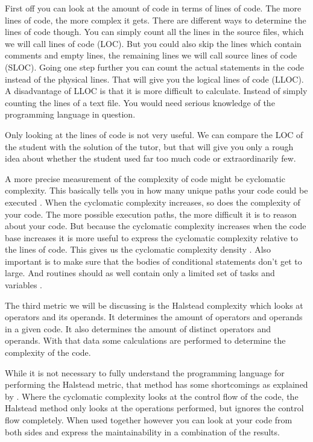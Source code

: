 First off you can look at the amount of \gls{code}
in terms of lines of \gls{code}.
The more lines of \gls{code}, the more complex it gets.
There are different ways to determine the lines of \gls{code} though.
You can simply count all the lines in the source files,
which we will call lines of code (LOC).
But you could also skip the lines which contain comments and empty lines,
the remaining lines we will call source lines of code (SLOC).
Going one step further you can count the actual statements in the \gls{code}
instead of the physical lines.
That will give you the logical lines of code (LLOC).
A disadvantage of LLOC is that it is more difficult to calculate.
Instead of simply counting the lines of a text file.
You would need serious knowledge of the programming language in question.

Only looking at the lines of \gls{code} is not very useful.
We can compare the LOC of the \gls{student}
with the \gls{solution} of the \gls{tutor},
but that will give you only a rough idea about
whether the \gls{student} used far too much \gls{code} or extraordinarily few.

A more precise measurement of the complexity of code
might be cyclomatic complexity.
This basically tells you in how many unique paths
your \gls{code} could be executed \citep{website:js-complexity}.
When the cyclomatic complexity increases,
so does the complexity of your \gls{code}.
The more possible execution paths,
the more difficult it is to reason about your \gls{code}.
But because the cyclomatic complexity increases
when the code base increases
it is more useful to express the cyclomatic complexity relative to
the lines of \gls{code}.
This gives us the cyclomatic complexity density \citep{gill1991cyclomatic}.
Also important is to make sure that
the bodies of conditional statements don't get to large.
And routines should as well contain only a limited set of tasks and variables
\citep{stegeman2014empirically}.

The third metric we will be discussing is the Halstead complexity
which looks at operators and its operands.
It determines the amount of operators and operands in a given \gls{code}.
It also determines the amount of distinct operators and operands.
With that data some calculations are performed
to determine the complexity of the \gls{code}.

While it is not necessary to fully understand
the programming language for performing the Halstead metric,
that method has some shortcomings as explained by \citet{yu2010survey}.
Where the cyclomatic complexity looks at the control flow of the code,
the Halstead method only looks at the operations performed,
but ignores the control flow completely.
When used together however you can look at your \gls{code} from both sides
and express the \gls{maintainability} in a combination of the results.

